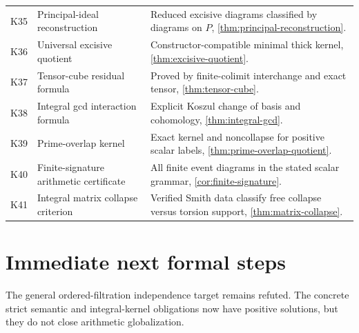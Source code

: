\documentclass[11pt]{article}
\theoremstyle{definition}
\theoremstyle{remark}
\begin{document}
\begin{longtable}{>{\raggedright\arraybackslash}p{} >{\raggedright\arraybackslash}p{} >{\raggedright\arraybackslash}p{}}
K35 & Principal-ideal reconstruction & Reduced excisive diagrams classified by diagrams on $P$, \cref{thm:principal-reconstruction}.\\
K36 & Universal excisive quotient & Constructor-compatible minimal thick kernel, \cref{thm:excisive-quotient}.\\
K37 & Tensor-cube residual formula & Proved by finite-colimit interchange and exact tensor, \cref{thm:tensor-cube}.\\
K38 & Integral gcd interaction formula & Explicit Koszul change of basis and cohomology, \cref{thm:integral-gcd}.\\
K39 & Prime-overlap kernel & Exact kernel and noncollapse for positive scalar labels, \cref{thm:prime-overlap-quotient}.\\
K40 & Finite-signature arithmetic certificate & All finite event diagrams in the stated scalar grammar, \cref{cor:finite-signature}.\\
K41 & Integral matrix collapse criterion & Verified Smith data classify free collapse versus torsion support, \cref{thm:matrix-collapse}.\\
\bottomrule
\end{longtable}

\section{Immediate next formal steps}

The general ordered-filtration independence target remains refuted. The concrete strict semantic and integral-kernel obligations now have positive solutions, but they do not close arithmetic globalization.
\end{document}
